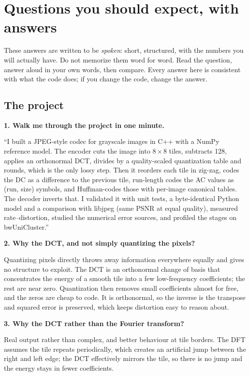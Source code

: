 \chapter{Questions you should expect, with answers}\label{ch:qa}

These answers are written to be \emph{spoken}: short, structured, with the numbers you will actually have. Do not memorize them word for word. Read the question, answer aloud in your own words, then compare. Every answer here is consistent with what the code does; if you change the code, change the answer.

\newcommand{\QA}[2]{\par\medskip\noindent\textbf{#1}\par\noindent #2\par}

\section{The project}

\QA{1. Walk me through the project in one minute.}{
``I built a JPEG-style codec for grayscale images in C++ with a NumPy reference model. The encoder cuts the image into $8\times8$ tiles, subtracts 128, applies an orthonormal DCT, divides by a quality-scaled quantization table and rounds, which is the only lossy step. Then it reorders each tile in zig-zag, codes the DC as a difference to the previous tile, run-length codes the AC values as (run, size) symbols, and Huffman-codes those with per-image canonical tables. The decoder inverts that. I validated it with unit tests, a byte-identical Python model and a comparison with libjpeg (same PSNR at equal quality), measured rate--distortion, studied the numerical error sources, and profiled the stages on bwUniCluster.''}

\QA{2. Why the DCT, and not simply quantizing the pixels?}{
Quantizing pixels directly throws away information everywhere equally and gives no structure to exploit. The DCT is an orthonormal change of basis that concentrates the energy of a smooth tile into a few low-frequency coefficients; the rest are near zero. Quantization then removes small coefficients almost for free, and the zeros are cheap to code. It is orthonormal, so the inverse is the transpose and squared error is preserved, which keeps distortion easy to reason about.}

\QA{3. Why the DCT rather than the Fourier transform?}{
Real output rather than complex, and better behaviour at tile borders. The DFT assumes the tile repeats periodically, which creates an artificial jump between the right and left edge; the DCT effectively mirrors the tile, so there is no jump and the energy stays in fewer coefficients.}

